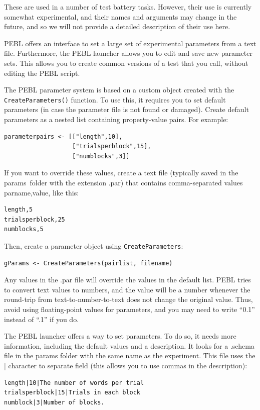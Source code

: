 These are used in a number of test battery tasks.  However, their use is currently somewhat experimental, and their names and arguments may change in the future, and so we will not provide a detailed description of their use here.

PEBL offers an interface to set a large set of experimental parameters from a text file. Furthermore, the PEBL launcher allows you to edit and save new parameter sets.  This allows you to create common versions of a test that you call, without editing the PEBL script.

The PEBL parameter system is based on a custom object created with the \texttt{CreateParameters()} function.  To use this, it requires you to set default parameters (in case the parameter file is not found or damaged).  Create default parameters as a nested list containing property-value pairs.  For example:

\begin{verbatim}
parameterpairs <- [["length",10],
                   ["trialsperblock",15],
                   ["numblocks",3]]
\end{verbatim}

If you want to override these values, create a text file (typically saved in the params\ folder with the extension .par) that contains comma-separated values parname,value, like this:
\begin{verbatim}
length,5
trialsperblock,25
numblocks,5
\end{verbatim}


Then, create a parameter object using \texttt{CreateParameters}:

\begin{verbatim}
gParams <- CreateParameters(pairlist, filename)
\end{verbatim}

Any values in the .par file will override the values in the default list.  PEBL tries to convert text values to numbers, and the value will be a number whenever the round-trip from text-to-number-to-text does not change the original value.  Thus, avoid using floating-point values for parameters, and you may need to write 
``0.1'' instead of ``.1'' if you do.

The PEBL launcher offers a way to set parameters.  To do so, it needs more information, including the default values and a description.  It looks for a .schema file  in the params folder with the same name as the experiment. This file uses the | character to separate field (this allows you to use commas in the description):
\begin{verbatim}
length|10|The number of words per trial
trialsperblock|15|Trials in each block
numblock|3|Number of blocks.
\end{verbatim}

